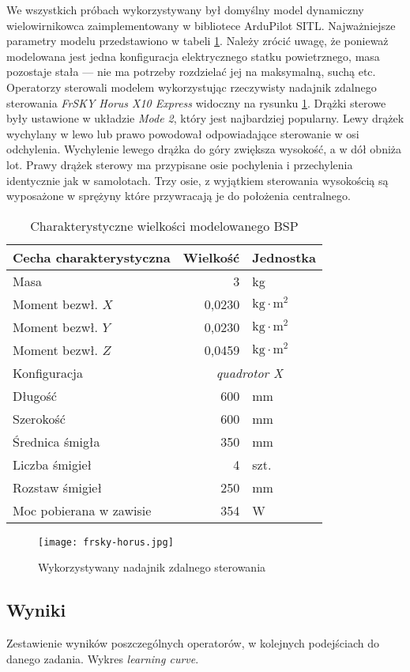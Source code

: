 We wszystkich próbach wykorzystywany był domyślny model dynamiczny wielowirnikowca zaimplementowany w bibliotece ArduPilot SITL\cite{sitl-model}. Najważniejsze parametry modelu przedstawiono w tabeli \ref{tab:sitl-model}. Należy zrócić uwagę, że ponieważ modelowana jest jedna konfiguracja elektrycznego statku powietrznego, masa pozostaje stała --- nie ma potrzeby rozdzielać jej na maksymalną, suchą etc. Operatorzy sterowali modelem wykorzystując rzeczywisty nadajnik zdalnego sterowania \emph{FrSKY Horus X10 Express} widoczny na rysunku \ref{fig:frsky-horus}. Drążki sterowe były ustawione w układzie \emph{Mode 2}, który jest najbardziej popularny\cite{mcnabb2021}. Lewy drążek wychylany w lewo lub prawo powodował odpowiadające sterowanie w osi odchylenia. Wychylenie lewego drążka do góry zwiększa wysokość, a w dół obniża lot. Prawy drążek sterowy ma przypisane osie pochylenia i przechylenia identycznie jak w samolotach. Trzy osie, z wyjątkiem sterowania wysokością są wyposażone w sprężyny które przywracają je do położenia centralnego.
\begin{table}[!h] \centering
    \caption{Charakterystyczne wielkości modelowanego BSP}
    \label{tab:sitl-model}

    \begin{tabular}{|l | r|l |}
    \hline
    Cecha charakterystyczna & Wielkość & Jednostka \\ \hline \hline
    Masa & 3 & kg \\ \hline
    Moment bezwł. $ X $ & 0,0230 & $ \text{kg}\cdot\text{m}^2 $ \\ \hline
    Moment bezwł. $ Y $ & 0,0230 & $ \text{kg}\cdot\text{m}^2 $ \\ \hline
    Moment bezwł. $ Z $ & 0,0459 & $ \text{kg}\cdot\text{m}^2 $ \\ \hline
    Konfiguracja & \multicolumn{2}{c|}{\emph{quadrotor X}} \\ \hline
    Długość & 600 & mm \\ \hline
    Szerokość & 600 & mm \\ \hline
    Średnica śmigła & 350 & mm \\ \hline
    Liczba śmigieł & 4 & szt. \\ \hline
    Rozstaw śmigieł & 250 & mm \\ \hline
    Moc pobierana w zawisie & 354 & W \\ \hline
  \end{tabular}
\end{table}

\begin{figure}[!h]
    \centering \texttt{[image: frsky-horus.jpg]}
    \caption{Wykorzystywany nadajnik zdalnego sterowania}
    \label{fig:frsky-horus}
\end{figure}

\subsection{Wyniki}
\begin{todo}
    Zestawienie wyników poszczególnych operatorów, w kolejnych podejściach do danego zadania. Wykres \emph{learning curve}.
\end{todo}